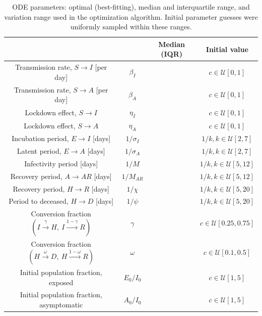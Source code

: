 \documentclass[11pt]{article}
\newcommand{\U}{\mathcal{U}}
\begin{document}
	\begin{table}[h]
		\centering
		\caption{ODE parameters: optimal (best-fitting), median and interquartile range, and variation range used in the optimization algorithm.
			Initial parameter guesses were uniformly sampled within these ranges.}
		\label{tab:parameters}
		\begin{tabular}{ c c c c }
			\hline
			\hline
																								&					&	Median (IQR)	&	Initial value \\
			\hline
			Transmission rate, $S \to I$ [per day]												&	$\beta_{I}$		&									&	$c \in \U [0,1]$ \\
			Transmission rate, $S \to A$ [per day]												&	$\beta_{A}$		&									& 	$c \in \U [0,1]$ \\
			Lockdown effect, $S \to I$															&	$\eta_{I}$ 		&									& 	$c \in \U [0,1]$ \\
			Lockdown effect, $S \to A$															&	$\eta_{A}$		&									& 	$c \in \U [0,1]$ \\
			Incubation period, $E \to I$ [days]													&	$1 / \sigma_I$	&									& 	$1 / k, k \in \U [2,7]$ \\
			Latent period, $E \to A$ [days]														&	$1 / \sigma_A$	&									& 	$1 / k, k \in \U [2,7]$ \\
			Infectivity period [days]															&	$1 / M$			&									& 	$1 / k, k \in \U [5,12]$ \\
			Recovery period, $A \to AR$ [days]													&	$1 / M_{AR}$	&									& 	$1 / k, k \in \U [5,12]$ \\
			Recovery period, $H \to R$ [days]													&	$1 / \chi$		&									& 	$1 / k, k \in \U [5,20]$ \\
			Period to deceased, $H \to D$ [days]												&	$1 / \psi$		&									& 	$1 / k, k \in \U [5,20]$ \\
			Conversion fraction $(I \xrightarrow{\gamma} H, \ I \xrightarrow{1 - \gamma} R)$	&	$\gamma$		&									& 	$c \in \U [0.25,0.75]$ \\
			Conversion fraction $(H \xrightarrow{\omega} D, \ H \xrightarrow{1 - \omega} R)$	&	$\omega$		&									& 	$c \in \U [0.1,0.5]$ \\
			Initial population fraction, exposed												&	$E_0 / I_0$		&									& 	$c \in \U [1,5]$ \\
			Initial population fraction, asymptomatic											&	$A_0 / I_0$		&									& 	$c \in \U [1,5]$ \\
			\hline
			\hline
		\end{tabular}
	\end{table}
\end{document}
